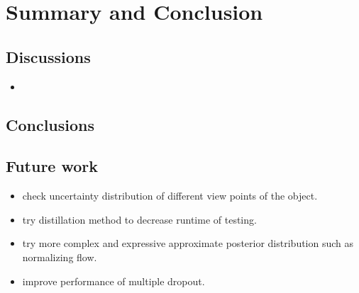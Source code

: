 \chapter{Summary and Conclusion}
\section{Discussions}

\begin{itemize}
	\item 
\end{itemize}

\section{Conclusions}

\section{Future work}
\begin{itemize}
	\item check uncertainty distribution of different view points of the object.
	\item try distillation method to decrease runtime of testing.
	\item try more complex and expressive approximate posterior distribution such as normalizing flow.
	\item improve performance of multiple dropout.
\end{itemize}